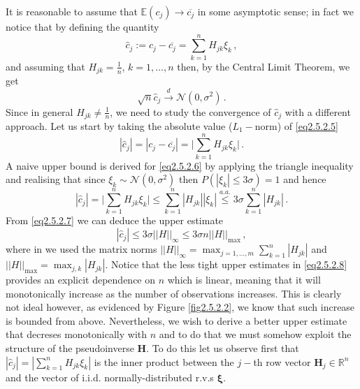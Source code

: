 \documentclass[../main.tex]{subfiles}
\begin{document}
It is reasonable to assume that $\mathbb{E}(c_{j})\to\overline{c_{j}}$ in some asymptotic sense; in fact we notice that by defining the quantity
\begin{equation}\label{eq2.5.2.5}
     \hat{c}_{j}:=c_{j} - \overline{c_{j}} = \sum_{k=1}^{n}H_{jk}\xi_{k}\,,
\end{equation}
and assuming that $H_{jk}=\frac{1}{n}$, $k=1,\dots,n$ then, by the Central Limit Theorem, we get
\begin{equation*}
        \sqrt{n}\hat{c}_{j}\xrightarrow{d}\mathcal{N}(0,\sigma^{2})\,.
\end{equation*}
Since in general $H_{jk}\neq \frac{1}{n}$, we need to study the convergence of $\hat{c}_{j}$ with a different approach.
Let us start by taking the absolute value ($L_{1}-$norm) of \eqref{eq2.5.2.5}
\begin{equation}\label{eq2.5.2.6}
        |\hat{c}_{j}| = |c_{j} - \overline{c_{j}}| = \bigg|\sum_{k=1}^{n}H_{jk}\xi_{k}\bigg|\,.
\end{equation}
A naive upper bound is derived for \eqref{eq2.5.2.6} by applying the triangle inequality and realising that since $\xi_{k}\sim \mathcal{N}(0,\sigma^{2})$ then $P(|\xi_{k}|\leq3\sigma)=1$ and hence
\begin{equation}\label{eq2.5.2.7}
        |\hat{c}_{j}| = \Bigg|\sum_{k=1}^{n}H_{jk}\xi_{k}\Bigg|\leq\sum_{k=1}^{n}|H_{jk}||\xi_{k}|\stackrel{a.a.}{\leq}3\sigma\sum_{k=1}^{n}|H_{jk}|\,.
\end{equation}
From \eqref{eq2.5.2.7} we can deduce the upper estimate
\begin{equation}\label{eq2.5.2.8}
     |\hat{c}_{j}|\leq3\sigma ||H||_{\infty} \leq3\sigma n ||H||_{\text{max}}\,,
\end{equation}
where in we used the matrix norms $||H||_{\infty} = \max_{j=1,\dots,m}\sum_{k=1}^{n}|H_{jk}|$ and $||H||_{\text{max}} = \max_{j,k}|H_{jk}| $. 
Notice that the less tight upper estimates in \eqref{eq2.5.2.8} provides an explicit dependence on $n$ which is linear, meaning that it will monotonically increase as the number of observations increases.
This is clearly not ideal however, as evidenced by Figure \ref{fig2.5.2.2}, we know that such increase is bounded from above.
Nevertheless, we wish to derive a better upper estimate that decreses monotonically with $n$ and to do that we must somehow exploit the structure of the pseudoinverse $\boldsymbol{H}$.
To do this let us observe first that $|\hat{c}_{j}| = |\sum_{k=1}^{n}H_{jk}\xi_{k}|$ is the inner product between the $j-$th row vector $\boldsymbol{H}_{j}\in \mathbb{R}^{n}$ and the vector of i.i.d. normally-distributed r.v.s $\boldsymbol{\xi}$.
\end{document}
